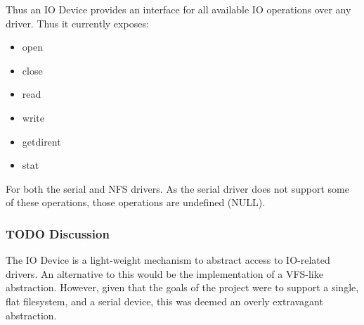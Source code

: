\documentclass[a4paper,12pt]{article}
\begin{document}
Thus an IO Device provides an interface for all available IO operations over
any driver.  Thus it currently exposes:

\begin{itemize}
\item open
\item close
\item read
\item write
\item getdirent
\item stat
\end{itemize}

For both the serial and NFS drivers.  As the serial driver does not support
some of these operations, those operations are undefined (NULL).

\subsubsection{TODO Discussion}
The IO Device is a light-weight mechanism to abstract access to IO-related
drivers.  An alternative to this would be the implementation of a VFS-like
abstraction.  However, given that the goals of the project were to support a
single, flat filesystem, and a serial device, this was deemed an overly
extravagant abstraction.
\end{document}
